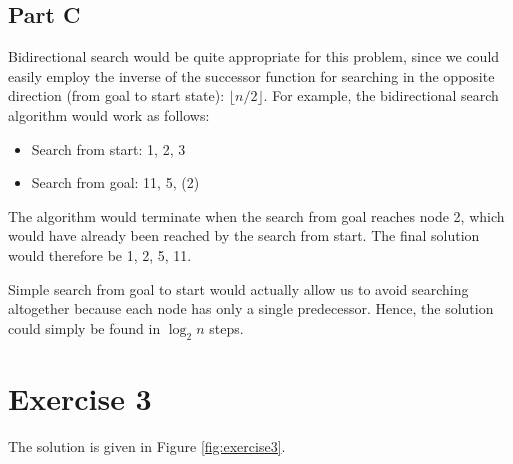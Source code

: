 \subsection*{Part C}

Bidirectional search would be quite appropriate for this problem, since we could easily employ the inverse of the successor function for searching in the opposite direction (from goal to start state): $\lfloor n/2 \rfloor$. For example, the bidirectional search algorithm would work as follows:

\begin{itemize}

\item Search from start: 1, 2, 3

\item Search from goal: 11, 5, (2)

\end{itemize}

The algorithm would terminate when the search from goal reaches node 2, which would have already been reached by the search from start. The final solution would therefore be 1, 2, 5, 11.

Simple search from goal to start would actually allow us to avoid searching altogether because each node has only a single predecessor. Hence, the solution could simply be found in $\log_2{n}$ steps.

\section*{Exercise 3}

The solution is given in Figure \ref{fig:exercise3}.

